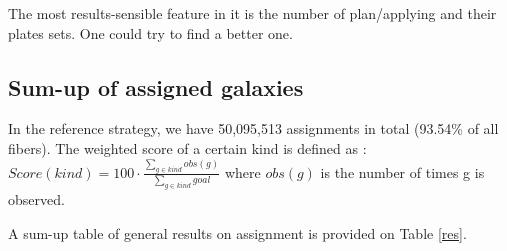 \documentclass{extarticle}
\def\lya{Ly-$\alpha$\ }
\begin{document}
The most results-sensible feature in it is the number of plan/applying and their plates sets. One could try to find a better one.


\subsection{Sum-up of assigned galaxies}
In the reference strategy, we have 50,095,513 assignments in total (93.54\% of all fibers). The weighted score of a certain kind is defined as : 
\vspace{1\baselineskip}
$Score(kind) = 100\cdot \frac{\sum\nolimits_{g \in kind} obs(g)}{\sum\nolimits_{g \in kind} goal}$ where $obs(g)$ is the number of times g is observed.

A sum-up table of general results on assignment is provided on Table \ref{res}.

\end{document}
